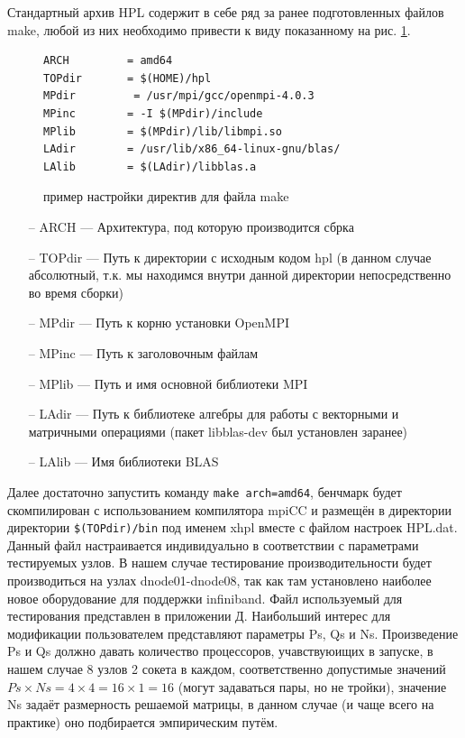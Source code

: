 \documentclass[a4paper]{extarticle}
\begin{document}
Стандартный архив HPL содержит в себе ряд за ранее подготовленных файлов make, любой из них необходимо привести к виду показанному на рис. \ref{fig:hplmake}.

\begin{figure}[H]
\centering
\begin{verbatim}
ARCH         = amd64
TOPdir       = $(HOME)/hpl
MPdir         = /usr/mpi/gcc/openmpi-4.0.3
MPinc        = -I $(MPdir)/include
MPlib        = $(MPdir)/lib/libmpi.so
LAdir        = /usr/lib/x86_64-linux-gnu/blas/
LAlib        = $(LAdir)/libblas.a
\end{verbatim}
\captionsetup{labelfont=bf, labelsep=space}
\caption{пример настройки директив для файла make}
\label{fig:hplmake}
\end{figure}

\begin{itemize}
\item[--] ARCH --- Архитектура, под которую производится сбрка
\item[--] TOPdir --- Путь к директории с исходным кодом hpl  (в данном случае абсолютный, т.к. мы находимся внутри данной директории непосредственно во время сборки)
\item[--] MPdir --- Путь к корню установки OpenMPI
\item[--] MPinc --- Путь к заголовочным файлам
\item[--] MPlib --- Путь и имя основной библиотеки MPI
\item[--] LAdir --- Путь к библиотеке алгебры для работы с векторными и матричными операциями (пакет libblas-dev был установлен заранее)
\item[--] LAlib --- Имя библиотеки BLAS
\end{itemize}

Далее достаточно запустить команду \texttt{make arch=amd64}, бенчмарк будет скомпилирован с использованием компилятора mpiCC  и размещён в директории директории \texttt{\$(TOPdir)/bin} под именем xhpl вместе с файлом настроек HPL.dat. Данный файл настраивается индивидуально в соответствии с параметрами тестируемых узлов. В нашем случае тестирование производительности будет производиться на узлах dnode01-dnode08, так как там установлено наиболее новое оборудование для поддержки infiniband. Файл используемый для тестирования представлен в приложении Д. Наибольший интерес для модификации пользователем представляют параметры Ps, Qs и Ns. Произведение Ps и Qs должно давать количество процессоров, учавствуюищих в запуске, в нашем случае 8 узлов  2 сокета в каждом, соответственно допустимые значений $Ps \times Ns = 4 \times 4 = 16 \times 1 = 16$ (могут задаваться пары, но не тройки), значение Ns задаёт размерность решаемой матрицы, в данном случае (и чаще всего на практике) оно подбирается эмпирическим путём.
\end{document}
